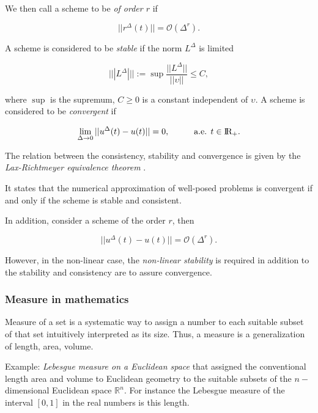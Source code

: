 We then call a scheme to be \textit{ of order $r$ } if 

\begin{equation}
|| r^{\Delta}(t) || = \mathcal{O}(\Delta^r).
\end{equation}

A scheme is considered to be \textit{stable} if the norm $L^{\Delta}$ is limited 

\begin{equation}
|||L^{\Delta}||| := \sup \frac{||L^{\Delta}||}{||\upsilon||}\leq C,
\end{equation}

where $\sup$ is the supremum, $C\geq 0$ is a constant independent of $\upsilon$. 
A scheme is considered to be \textit{convergent} if 

\begin{equation}
\lim_{\Delta\rightarrow 0} ||u^{\Delta}(t)-u(t)|| = 0, \hspace{10mm} \text{a.e. } t\in \text{I\!R}_{+}.
\end{equation}

The relation between the consistency, stability and convergence is given by the 
\textit{Lax-Richtmeyer equivalence theorem} \cite{Lax:1956}. 

It states that the numerical approximation of well-posed problems is convergent if and only if the scheme is stable and consistent. 

In addition, consider a scheme of the order $r$, then

\begin{equation}
|| u^{\Delta}(t) - u(t) || = \mathcal{O}(\Delta^r).
\end{equation}

However, in the non-linear case, the \textit{non-linear stability} is required in addition to the stability and consistency are to assure convergence. 



\subsubsection*{Measure in mathematics}

Measure of a set is a systematic way to assign a number to each suitable subset of that set intuitively interpreted as its size. 
Thus, a measure is a generalization of length, area, volume. 

Example: \textit{Lebesgue measure on a Euclidean space} that assigned the conventional length area and volume to Euclidean geometry to the suitable subsets of the $n-$dimensional Euclidean space $\mathbb{R}^n$. 
For instance the Lebesgue measure of the interval $[0,1]$ in the real numbers is this length. 

